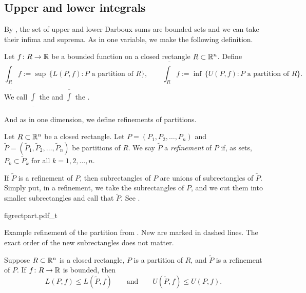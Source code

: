 \subsection{Upper and lower integrals}

By , the set of upper and lower Darboux sums are bounded sets and we can take
their infima and suprema.  As in one variable, we make the following definition.

\begin{defn}
Let $f \colon R \to {\mathbb{R}}$ be a bounded function on a closed rectangle $R \subset
{\mathbb{R}}^n$.
Define
\begin{equation*}
\underline{\int_R} f
:= \sup \, \bigl\{ L(P,f) : P \text{ a partition of } R \bigr\} , 
\qquad
\overline{\int_R} f
:= \inf \, \bigl\{ U(P,f) : P \text{ a partition of } R \bigr\} .
\end{equation*}
We call $\underline{\int}$ the
\emph{} and
$\overline{\int}$ the \emph{}.
\end{defn}

And as in one dimension, we define refinements of partitions.

\begin{defn}
Let $R \subset {\mathbb{R}}^n$ be a closed rectangle.
Let $P = ( P_1, P_2, \ldots, P_n )$
and $\widetilde{P} = ( \widetilde{P}_1, \widetilde{P}_2, \ldots, \widetilde{P}_n )$
be partitions of $R$.  We say $\widetilde{P}$ a
\emph{refinement} of $P$
if, as sets, $P_k \subset \widetilde{P}_k$ for all $k = 1,2,\ldots,n$.
\end{defn}

If $\widetilde{P}$ is a refinement of $P$,
then subrectangles of $P$ are unions of subrectangles of $\widetilde{P}$.
Simply put, in a refinement, we take the subrectangles of $P$,
and we cut them into smaller subrectangles and call that $\widetilde{P}$.
See .

\begin{myfigureht}
{figrectpart.pdf_t}
\caption{Example refinement of the partition from .
New  are marked in
dashed lines.  The exact order of the new subrectangles does not
matter.\label{mv:figrectpart}}
\end{myfigureht}

\begin{prop} \label{mv:prop:refinement}
Suppose $R \subset {\mathbb{R}}^n$ is a closed rectangle, $P$ is a partition of $R$,
and $\widetilde{P}$ is a refinement of $P$.
If $f \colon R \to {\mathbb{R}}$ is bounded,
then
\begin{equation*}
L(P,f) \leq L(\widetilde{P},f) 
\qquad \text{and} \qquad
U(\widetilde{P},f) \leq U(P,f) .
\end{equation*}
\end{prop}

